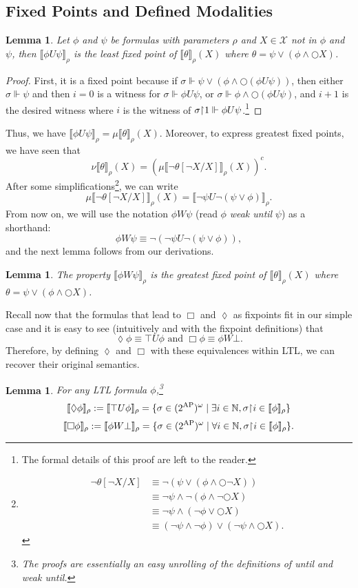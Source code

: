 \documentclass{tufte-handout} %
\newtheorem{lem}[thm]{Lemma}
\theoremstyle{definition}
\theoremstyle{remark}
\newcommand{\bra}[1]{\left(#1\right)}
\newcommand{\N}{\mathbb{N}}
\newcommand{\0}{\textsf{0}}
\newcommand{\1}{\textsf{1}}
\newcommand{\mX}{\mathcal{X}}
\newcommand{\AP}{\text{AP}}
\newcommand{\rest}[2]{#1 \kern-0.65ex\upharpoonright \kern-0.55ex #2}
\newcommand{\sem}[2]{\llbracket #1 \rrbracket_{#2}}
\begin{document}
\subsection{Fixed Points and Defined Modalities}
\begin{lem}
	Let $\phi$ and $\psi$ be formulas with parameters $\rho$ and $X \in \mX$ not in $\phi$ and $\psi$, then $\sem{\phi U \psi}{\rho}$ is the least fixed point of $\sem{\theta}{\rho}(X)$ where $\theta = \psi \vee (\phi \wedge \bigcirc X)$.
\end{lem}
\begin{proof}
	First, it is a fixed point because if $\sigma \Vdash \psi \vee (\phi \wedge \bigcirc (\phi U \psi))$, then either $\sigma \Vdash \psi$ and then $i =0$ is a witness for $\sigma \Vdash \phi U \psi$, or $\sigma \Vdash \phi \wedge \bigcirc (\phi U \psi)$, and $i+1$ is the desired witness where $i$ is the witness of $\rest{\sigma}{1} \Vdash \phi U \psi$.\footnote{The formal details of this proof are left to the reader.}
\end{proof}
Thus, we have $\sem{\phi U \psi}{\rho} = \mu\sem{\theta}{\rho}(X)$. Moreover, to express greatest fixed points, we have seen that 
\[\nu \sem{\theta}{\rho}(X) = \bra{\mu\sem{\neg\theta[\neg X/X]}{\rho}(X)}^c.\]
After some simplifications\footnote{\begin{align*}
	\neg \theta[ \neg X/ X] &\equiv \neg \bra{\psi \vee \bra{\phi \wedge \bigcirc \neg X}}\\
	&\equiv \neg \psi \wedge \neg\bra{\phi \wedge \neg\bigcirc X}\\
	&\equiv \neg\psi \wedge \bra{\neg\phi \vee \bigcirc X}\\
	&\equiv (\neg \psi \wedge \neg \phi) \vee (\neg \psi\wedge \bigcirc X).
	\end{align*}}, we can write 
\[\mu\sem{\neg\theta[\neg X/X]}{\rho}(X) = \sem{\neg \psi U \neg (\psi \vee \phi)}{\rho}.\]
From now on, we will use the notation $\phi W \psi$ (read $\phi$ \textit{weak until} $\psi$) as a shorthand: 
\[\phi W \psi \equiv \neg\bra{\neg \psi U \neg (\psi \vee \phi)},\]
and the next lemma follows from our derivations.
\begin{lem}
	The property $\sem{\phi W \psi}{\rho}$ is the greatest fixed point of $\sem{\theta}{\rho}(X)$ where $\theta = \psi \vee (\phi \wedge \bigcirc X)$.
\end{lem}
Recall now that the formulas that lead to $\Box$ and $\lozenge$ as fixpoints fit in our simple case and it is easy to see (intuitively and with the fixpoint definitions) that \[\lozenge \phi \equiv \top U \phi \text{ and }\Box\phi \equiv \phi W \bot.\]
Therefore, by defining $\lozenge$ and $\Box$ with these equivalences within LTL, we can recover their original semantics.
\begin{lem}
	For any LTL formula $\phi$,\footnote{The proofs are essentially an easy unrolling of the definitions of until and weak until.}
	\[\sem{\lozenge \phi}{\rho}:= \sem{\top U \phi}{\rho} = \{\sigma \in (2^{\AP})^{\omega} \mid \exists i \in\N, \rest{\sigma}{i} \in \sem{\phi}{\rho}\}\] \[\sem{\Box \phi}{\rho}:= \sem{\phi W \bot}{\rho} = \{\sigma \in (2^{\AP})^{\omega} \mid \forall i \in\N, \rest{\sigma}{i} \in \sem{\phi}{\rho}\}.\]
\end{lem} 
\end{document}
